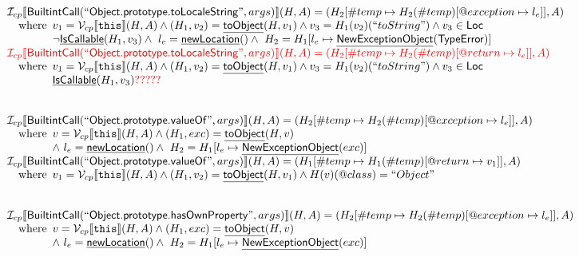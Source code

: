 \documentclass{article}
\makeatletter
\newcommand{\SF}[1]{\mbox{\textsf{#1}}}
\newcommand{\TT}[1]{\mbox{\texttt{#1}}}
\newcommand{\wherec}[1]{{\rm where}\begin{array}[t]{l}#1\end{array}}
\newcommand{\Loc}{\SF{Loc}}
\newcommand{\I}{\mathcal{I}}
\newcommand{\V}{\mathcal{V}}
\newcommand{\lbr}{\llbracket}
\newcommand{\rbr}{\rrbracket}
\newcommand{\hf}[1]{\underline{\sf #1}}
\newcommand{\varloc}[1]{\##1}
\newcommand{\varprop}[1]{@#1}
\def\inred{\color{red}}
\def\inred{\color{red}}
\makeatother
\begin{document}
\[\begin{array}{l}
\I _{cp}\lbr \SF{BuiltintCall}(``\SF{Object.prototype.toLocaleString}",args)\rbr(H,A)
 = (H_2[\varloc{temp}\mapsto H_2(\varloc{temp})[\varprop{exception}\mapsto l_e]], A) \\
\quad\wherec{
  v_1 = \V _{cp}\lbr \TT{this}\rbr (H,A) \land (H_1, v_2) = \hf{toObject}(H, v_1)
  \land  v_3 = H_1(v_2)(``toString") \land v_3 \in \Loc\\
  \neg \hf{IsCallable}(H_1, v_3)
  \land\ l_e = \hf{newLocation}() \land\ H_2=H_1[l_e\mapsto\hf{NewExceptionObject}(\SF{TypeError})]
  }\\
  
\inred \I _{cp}\lbr \SF{BuiltintCall}(``\SF{Object.prototype.toLocaleString}",args)\rbr(H,A)
 = (H_2[\varloc{temp}\mapsto H_2(\varloc{temp})[\varprop{return}\mapsto l_e]], A) \\
\quad\wherec{
  v_1 = \V _{cp}\lbr \TT{this}\rbr (H,A) \land (H_1, v_2) = \hf{toObject}(H, v_1)
  \land  v_3 = H_1(v_2)(``toString") \land v_3 \in \Loc\\
  \hf{IsCallable}(H_1, v_3)
  \inred ?????
  }\\
\\\\



\I _{cp}\lbr \SF{BuiltintCall}(``\SF{Object.prototype.valueOf}",args)\rbr(H,A)
 = (H_2[\varloc{temp}\mapsto H_2(\varloc{temp})[\varprop{exception}\mapsto l_e]], A) \\
\quad\wherec{
  v = \V _{cp}\lbr \TT{this}\rbr (H,A) \land (H_1, exc) = \hf{toObject}(H, v)\\
  \land\ l_e = \hf{newLocation}() \land\ H_2=H_1[l_e\mapsto\hf{NewExceptionObject}(exc)] 
  }\\
  
\I _{cp}\lbr \SF{BuiltintCall}(``\SF{Object.prototype.valueOf}",args)\rbr(H,A)
 = (H_1[\varloc{temp}\mapsto H_1(\varloc{temp})[\varprop{return}\mapsto v_1]], A) \\
\quad\wherec{
  v_1 = \V _{cp}\lbr \TT{this}\rbr (H,A) \land (H_1, v_2) = \hf{toObject}(H, v_1)
  \land H(v)(\varprop{class})=``Object"
  }\\
\\\\



\I _{cp}\lbr \SF{BuiltintCall}(``\SF{Object.prototype.hasOwnProperty}",args)\rbr(H,A)
 = (H_2[\varloc{temp}\mapsto H_2(\varloc{temp})[\varprop{exception}\mapsto l_e]], A) \\
\quad\wherec{
  v = \V _{cp}\lbr \TT{this}\rbr (H,A) \land (H_1, exc) = \hf{toObject}(H, v)\\
  \land\ l_e = \hf{newLocation}() \land\ H_2=H_1[l_e\mapsto\hf{NewExceptionObject}(exc)] 
  }\\
  

\end{array}\]
\end{document}
